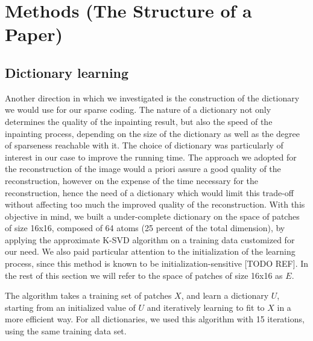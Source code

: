 \section{Methods (The Structure of a Paper)}
\label{sec:methods}
\label{sec:structure-paper}



\subsection{Dictionary learning}

Another direction in which we investigated is the construction of the dictionary we would use for our sparse coding. The nature of a dictionary not only determines the quality of the inpainting result, but also the speed of the inpainting process, depending on the size of the dictionary as well as the degree of sparseness reachable with it. 
The choice of dictionary was particularly of interest in our case to improve the running time. The approach we adopted for the reconstruction of the image would a priori assure a good quality of the reconstruction, however on the expense of the time necessary for the reconstruction, hence the need of a dictionary which would limit this trade-off without affecting too much the improved quality of the reconstruction.
With this objective in mind, we built a under-complete dictionary on the space of patches of size 16x16, composed of 64 atoms (25 percent of the total dimension), by applying the approximate K-SVD algorithm on a training data customized for our need. We also paid particular attention to the initialization of the learning process, since this method is known to be initialization-sensitive [TODO REF]. In the rest of this section we will refer to the space of patches of size 16x16 as $E$.

The algorithm takes a training set of patches $X$, and learn a dictionary $U$, starting from an initialized value of $U$ and iteratively learning to fit to $X$ in a more efficient way. 
For all dictionaries, we used this algorithm with 15 iterations, using the same training data set.

